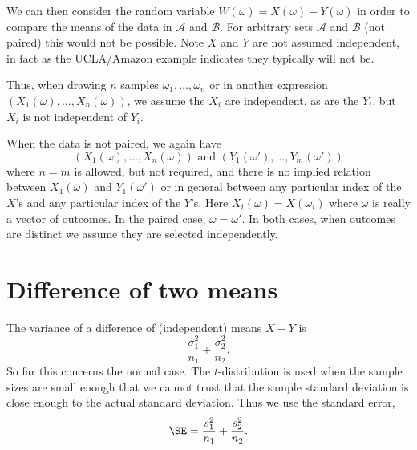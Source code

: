 We can then consider the random variable $W(\omega) = X(\omega)-Y(\omega)$ in order to compare the means of the data in $\mathcal A$ and $\mathcal B$. For arbitrary sets $\mathcal A$ and $\mathcal B$ (not paired) this would not be possible. Note $X$ and $Y$ are not assumed independent, in fact as the UCLA/Amazon example indicates they typically will not be.

Thus, when drawing $n$ samples $\omega_1,\dots,\omega_n$ or in another expression $(X_1(\omega),\dots,X_n(\omega))$, we assume the $X_i$ are independent, as are the $Y_i$, but $X_i$ is not independent of $Y_i$.

When the data is not paired, we again have
\[
	(X_1(\omega),\dots,X_n(\omega))\text{ and }(Y_1(\omega'),\dots,Y_m(\omega'))
\]
where $n=m$ is allowed, but not required, and there is no implied relation between $X_1(\omega)$ and $Y_1(\omega')$ or in general between any particular index of the $X$'s and any particular index of the $Y$'s. Here $X_i(\omega)=X(\omega_i)$ where $\omega$ is really a vector of outcomes. In the paired case, $\omega=\omega'$. In both cases, when outcomes are distinct we assume they are selected independently.

\section{Difference of two means}
\label{differenceOfTwoMeans}

The variance of a difference of (independent) means $\overline X-\overline Y$ is
\[
	\frac{\sigma_1^2}{n_1} + \frac{\sigma_2^2}{n_2}.
\]
So far this concerns the normal case. The $t$-distribution is used when the sample sizes are small enough that we cannot trust that the sample standard deviation is close enough to the actual standard deviation.
Thus we use the standard error,
\[
	\SE = \frac{s_1^2}{n_1} + \frac{s_2^2}{n_2}.
\]

